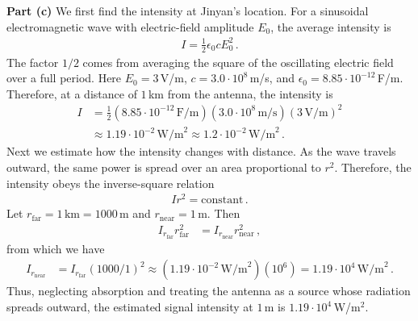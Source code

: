\documentclass[11pt]{article}
\begin{document}
\noindent\textbf{Part (c)} We first find the intensity at Jinyan's location. For a sinusoidal electromagnetic wave with electric-field amplitude $E_0$, the average intensity is
\begin{align*}
I = \frac{1}{2}\epsilon_0 cE_0^2\,.
\end{align*}
The factor $1/2$ comes from averaging the square of the oscillating electric field over a full period. Here $E_0=3\,$V/m, $c=3.0\cdot 10^8\,$m/s, and $\epsilon_0=8.85\cdot 10^{-12}\,$F/m. Therefore, at a distance of $1\,$km from the antenna, the intensity is
\begin{align*}
I
&=\frac{1}{2}(8.85\cdot 10^{-12}\,\text{F/m})(3.0\cdot 10^8\,\text{m/s})(3\,\text{V/m})^2\\
&\approx 1.19\cdot 10^{-2}\,\text{W/m}^2
\approx 1.2\cdot 10^{-2}\,\text{W/m}^2\,.
\end{align*}
Next we estimate how the intensity changes with distance. As the wave travels outward, the same power is spread over an area proportional to $r^2$. Therefore, the intensity obeys the inverse-square relation
\begin{align*}
Ir^2=\text{constant}\,.
\end{align*}
Let $r_{\text{far}}=1\,\text{km}=1000\,$m and $r_{\text{near}}=1\,$m. Then
\begin{align*}
I_{r_{\text{far}}}r_{\text{far}}^2
&=I_{r_{\text{near}}}r_{\text{near}}^2\,,
\end{align*}
from which we have
\begin{align*}
I_{r_{\text{near}}}
&=I_{r_{\text{far}}}\left(1000/1\right)^2\approx(1.19\cdot 10^{-2}\,\text{W/m}^2)(10^6)=1.19\cdot 10^4\,\text{W/m}^2\,.
\end{align*}
Thus, neglecting absorption and treating the antenna as a source whose radiation spreads outward, the estimated signal intensity at $1\,$m is $1.19\cdot 10^4\,$W/m$^2$.\\
\end{document}
